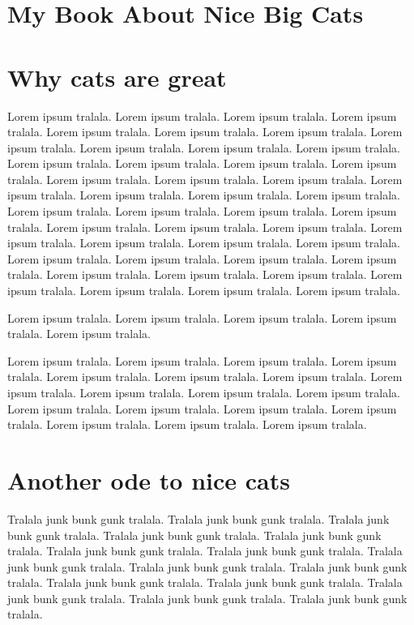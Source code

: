 \documentclass{book}
\begin{document}
\chapter{My Book About Nice Big Cats}



\chapter{Why cats are great}

Lorem ipsum tralala. Lorem ipsum tralala. Lorem ipsum tralala. Lorem ipsum tralala. Lorem ipsum tralala. Lorem ipsum tralala. Lorem ipsum tralala. Lorem ipsum tralala. Lorem ipsum tralala. Lorem ipsum tralala. Lorem ipsum tralala. Lorem ipsum tralala. Lorem ipsum tralala. Lorem ipsum tralala. Lorem ipsum tralala. Lorem ipsum tralala. Lorem ipsum tralala. Lorem ipsum tralala. Lorem ipsum tralala. Lorem ipsum tralala. Lorem ipsum tralala. Lorem ipsum tralala. Lorem ipsum tralala. Lorem ipsum tralala. Lorem ipsum tralala. Lorem ipsum tralala. Lorem ipsum tralala. Lorem ipsum tralala. Lorem ipsum tralala. Lorem ipsum tralala. Lorem ipsum tralala. Lorem ipsum tralala. Lorem ipsum tralala. Lorem ipsum tralala. Lorem ipsum tralala. Lorem ipsum tralala. Lorem ipsum tralala. Lorem ipsum tralala. Lorem ipsum tralala. Lorem ipsum tralala. Lorem ipsum tralala. Lorem ipsum tralala. Lorem ipsum tralala. Lorem ipsum tralala. 

Lorem ipsum tralala. Lorem ipsum tralala. Lorem ipsum tralala. Lorem ipsum tralala. Lorem ipsum tralala. 

Lorem ipsum tralala. Lorem ipsum tralala. Lorem ipsum tralala. Lorem ipsum tralala. Lorem ipsum tralala. Lorem ipsum tralala. Lorem ipsum tralala. Lorem ipsum tralala. Lorem ipsum tralala. Lorem ipsum tralala. Lorem ipsum tralala. Lorem ipsum tralala. Lorem ipsum tralala. Lorem ipsum tralala. Lorem ipsum tralala. Lorem ipsum tralala. Lorem ipsum tralala. Lorem ipsum tralala. 



\chapter{Another ode to nice cats}

Tralala junk bunk gunk tralala. Tralala junk bunk gunk tralala. Tralala junk bunk gunk tralala. Tralala junk bunk gunk tralala. Tralala junk bunk gunk tralala. Tralala junk bunk gunk tralala. Tralala junk bunk gunk tralala. Tralala junk bunk gunk tralala. Tralala junk bunk gunk tralala. Tralala junk bunk gunk tralala. Tralala junk bunk gunk tralala. Tralala junk bunk gunk tralala. Tralala junk bunk gunk tralala. Tralala junk bunk gunk tralala. Tralala junk bunk gunk tralala. 
\end{document}
